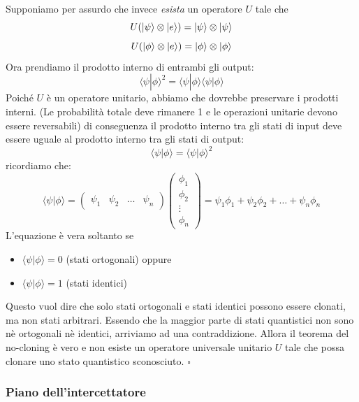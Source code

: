 \documentclass[a4paper]{article}
\begin{document}
Supponiamo per assurdo che invece \textit{esista} un operatore $U$ tale che
\[U(\ket{\psi} \otimes \ket{e}) = \ket{\psi} \otimes \ket{\psi}\]
\[U(\ket{\phi} \otimes \ket{e}) = \ket{\phi} \otimes \ket{\phi}\]
Ora prendiamo il prodotto interno di entrambi gli output:
\[
\langle \psi | \phi \rangle^2 = \langle \psi | \phi \rangle  \langle \psi | \phi \rangle
\]
Poiché $U$ è un operatore unitario, abbiamo che dovrebbe preservare i prodotti interni.
(Le probabilità totale deve rimanere 1 e le operazioni unitarie devono essere reversabili)
di conseguenza il prodotto interno tra gli stati di input deve essere uguale al prodotto interno tra gli stati di output:
\[\langle \psi | \phi \rangle = \langle \psi | \phi \rangle^2 \]
ricordiamo che:
\[\langle \psi | \phi \rangle = \begin{pmatrix}
  \psi_1 & \psi_2 & \dots & \psi_n 
\end{pmatrix} \begin{pmatrix}
  \phi_1 \\
  \phi_2 \\
  \vdots \\
  \phi_n
\end{pmatrix} = \psi_1\phi_1 + \psi_2\phi_2 + \dots + \psi_n\phi_n\]
L'equazione è vera soltanto se 
\begin{itemize}
  \item $\langle \psi | \phi \rangle = 0$ (stati ortogonali) oppure
  \item $\langle \psi | \phi \rangle = 1$ (stati identici)
\end{itemize}
Questo vuol dire che solo stati ortogonali e stati identici possono essere clonati, ma non stati arbitrari.
Essendo che la maggior parte di stati quantistici non sono nè ortogonali nè identici, arriviamo ad una contraddizione.
Allora il teorema del no-cloning è vero e non esiste un operatore universale unitario $U$ tale che possa clonare uno stato quantistico sconosciuto. $\square$

\subsubsection{Piano dell'intercettatore}
\end{document}
